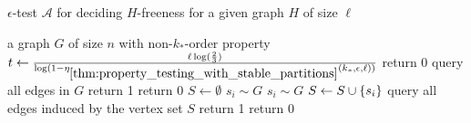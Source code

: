     \begin{algorithm}[H]
        \caption{$\epsilon$-test $\mathcal{A}$ for deciding $H$-freeness for a given graph $H$ of size $\ell$}
        \label{alg:h-freeness_tester}
        \begin{algorithmic}[1]
            \Require a graph $G$ of size $n$ with non-$k_*$-order property
            \State $t \leftarrow \frac{\ell \log( \frac{2}{3} )}
                {\log( 1 - \eta_{\ref{thm:property_testing_with_stable_partitions}}(k_*, \epsilon, \ell) )}$
                \State return 0 \label{line:G_smaller_then_H}
                \State query all edges in $G$
                    \State return 1 \label{line:G_small_enough_found_H}
                \Else
                    \State return 0 \label{line:G_small_enough_not_found_H}
                \EndIf
            \Else \label{line:random_sampling}
                \State $S \leftarrow \emptyset$
                    \State $s_{i} \sim G$
                        \State $s_{i} \sim G$
                    \EndWhile
                    \State $S \leftarrow S \cup \{ s_i \}$
                \EndWhile
                \State query all edges induced by the vertex set $S$
                    \State return 1 \label{line:found_H}
                \Else
                    \State return 0 \label{line:not_found_H}
                \EndIf
            \EndIf
        \end{algorithmic}
    \end{algorithm}

